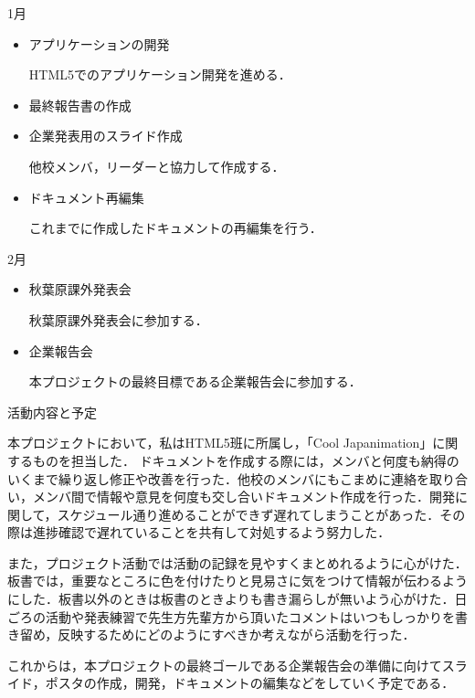 1月
\begin{itemize}
\item アプリケーションの開発
\par HTML5でのアプリケーション開発を進める．
\item 最終報告書の作成
\item 企業発表用のスライド作成
\par 他校メンバ，リーダーと協力して作成する．
\item ドキュメント再編集
\par これまでに作成したドキュメントの再編集を行う．
\end{itemize}
2月
\begin{itemize}
\item 秋葉原課外発表会
\par 秋葉原課外発表会に参加する．
\item 企業報告会
\par 本プロジェクトの最終目標である企業報告会に参加する．
\end{itemize}

活動内容と予定
\par 本プロジェクトにおいて，私はHTML5班に所属し，「Cool Japanimation」に関するものを担当した．
ドキュメントを作成する際には，メンバと何度も納得のいくまで繰り返し修正や改善を行った．他校のメンバにもこまめに連絡を取り合い，メンバ間で情報や意見を何度も交し合いドキュメント作成を行った．開発に関して，スケジュール通り進めることができず遅れてしまうことがあった．その際は進捗確認で遅れていることを共有して対処するよう努力した．
\par また，プロジェクト活動では活動の記録を見やすくまとめれるように心がけた．板書では，重要なところに色を付けたりと見易さに気をつけて情報が伝わるようにした．板書以外のときは板書のときよりも書き漏らしが無いよう心がけた．日ごろの活動や発表練習で先生方先輩方から頂いたコメントはいつもしっかりを書き留め，反映するためにどのようにすべきか考えながら活動を行った．
\par これからは，本プロジェクトの最終ゴールである企業報告会の準備に向けてスライド，ポスタの作成，開発，ドキュメントの編集などをしていく予定である．

